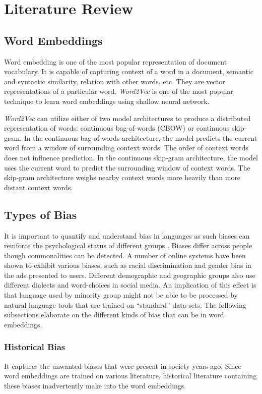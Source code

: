 \documentclass[12pt, a4paper]{article}
\begin{document}
	\section{Literature Review}
		
		\subsection{Word Embeddings}
			Word embedding is one of the most popular representation of document vocabulary. It is capable of capturing context of a word in a document, semantic and syntactic similarity, relation with other words, etc. They are vector representations of a particular word. \emph{Word2Vec} is one of the most popular technique to learn word embeddings using shallow neural network. 
			\par
			\emph{Word2Vec} can utilize either of two model architectures to produce a distributed representation of words: continuous bag-of-words (CBOW) or continuous skip-gram. In the continuous bag-of-words architecture, the model predicts the current word from a window of surrounding context words. The order of context words does not influence prediction. In the continuous skip-gram architecture, the model uses the current word to predict the surrounding window of context words. The skip-gram architecture weighs nearby context words more heavily than more distant context words.
			
		\subsection{Types of Bias}
			It is important to quantify and understand bias in languages as such biases can reinforce the psychological status of different groups \cite{4}. Biases differ across people though commonalities can be detected. A number of online systems have been shown to exhibit various biases, such as racial discrimination and gender bias in the ads presented to users. Different demographic and geographic groups also use different dialects and word-choices in social media. An implication of this effect is that language used by minority group might not be able to be processed by natural language tools that are trained on ``standard” data-sets. The following subsections elaborate on the different kinds of bias that can be in word embeddings.
			
			\subsubsection{Historical Bias}
				It captures the unwanted biases that were present in society years ago. Since word embeddings are trained on various literature, historical literature containing these biases inadvertently make into the word embeddings.
				
\end{document}
